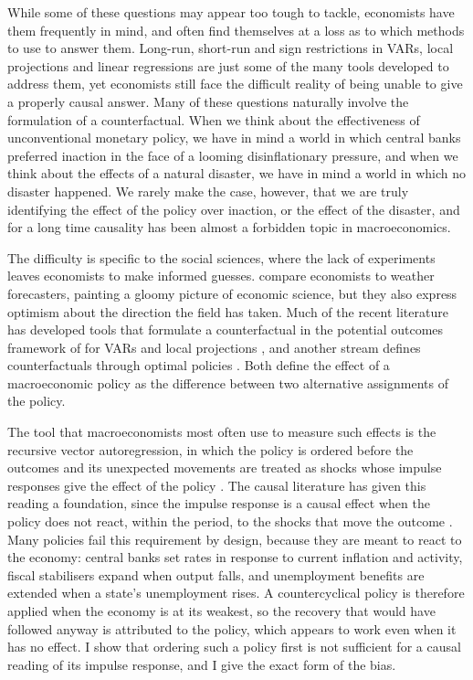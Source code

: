 \documentclass[12pt,a4paper]{article}
\theoremstyle{definition}
\theoremstyle{definition}\newtheorem{example}{Example}
\theoremstyle{definition}\newtheorem{definition}{Definition}
\begin{document}
While some of these questions may appear too tough to tackle, economists have them frequently in mind, and often find themselves at a loss as to which methods to use to answer them. Long-run, short-run and sign restrictions in VARs, local projections and linear regressions are just some of the many tools developed to address them, yet economists still face the difficult reality of being unable to give a properly causal answer. Many of these questions naturally involve the formulation of a counterfactual. When we think about the effectiveness of unconventional monetary policy, we have in mind a world in which central banks preferred inaction in the face of a looming disinflationary pressure, and when we think about the effects of a natural disaster, we have in mind a world in which no disaster happened. We rarely make the case, however, that we are truly identifying the effect of the policy over inaction, or the effect of the disaster, and for a long time causality has been almost a forbidden topic in macroeconomics.

The difficulty is specific to the social sciences, where the lack of experiments leaves economists to make informed guesses. \citet{Nakamura2018a} compare economists to weather forecasters, painting a gloomy picture of economic science, but they also express optimism about the direction the field has taken. Much of the recent literature has developed tools that formulate a counterfactual in the potential outcomes framework of \citet{Rubin1980} for VARs and local projections \citep{bojinovshephard2019,RambachanSheppard2021,dube2023local}, and another stream defines counterfactuals through optimal policies \citep{mckay2023can}. Both define the effect of a macroeconomic policy as the difference between two alternative assignments of the policy.

The tool that macroeconomists most often use to measure such effects is the recursive vector autoregression, in which the policy is ordered before the outcomes and its unexpected movements are treated as shocks whose impulse responses give the effect of the policy \citep{Sims1980,ChristianoEichenbaumEvans1999,Bloom2009}. The causal literature has given this reading a foundation, since the impulse response is a causal effect when the policy does not react, within the period, to the shocks that move the outcome \citep{RambachanSheppard2021}. Many policies fail this requirement by design, because they are meant to react to the economy: central banks set rates in response to current inflation and activity, fiscal stabilisers expand when output falls, and unemployment benefits are extended when a state's unemployment rises. A countercyclical policy is therefore applied when the economy is at its weakest, so the recovery that would have followed anyway is attributed to the policy, which appears to work even when it has no effect. I show that ordering such a policy first is not sufficient for a causal reading of its impulse response, and I give the exact form of the bias.
\end{document}
